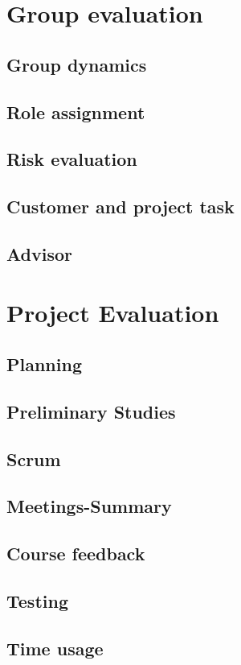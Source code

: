 \section{Group evaluation}
\subsection{Group dynamics}
\subsection{Role assignment}
\subsection{Risk evaluation}
\subsection{Customer and project task}
\subsection{Advisor}

\section{Project Evaluation}
\subsection{Planning}
\subsection{Preliminary Studies}
\subsection{Scrum}
\subsection{Meetings-Summary}
\subsection{Course feedback}
\subsection{Testing}
\subsection{Time usage}

